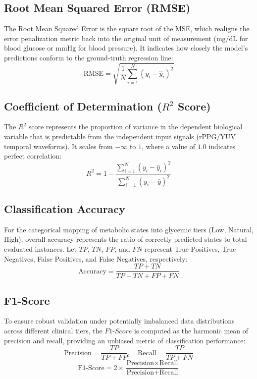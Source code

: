 \subsection{Root Mean Squared Error (RMSE)}
The Root Mean Squared Error is the square root of the MSE, which realigns the error penalization metric back into the original unit of measurement ($\text{mg/dL}$ for blood glucose or $\text{mmHg}$ for blood pressure). It indicates how closely the model's predictions conform to the ground-truth regression line:
\begin{equation}
\text{RMSE} = \sqrt{\frac{1}{N} \sum_{i=1}^{N} (y_i - \hat{y}_i)^2}
\end{equation}

\subsection{Coefficient of Determination (\texorpdfstring{$R^2$}{R2} Score)}
The $R^2$ score represents the proportion of variance in the dependent biological variable that is predictable from the independent input signals (rPPG/YUV temporal waveforms). It scales from $-\infty$ to $1$, where a value of $1.0$ indicates perfect correlation:
\begin{equation}
R^2 = 1 - \frac{\sum_{i=1}^{N} (y_i - \hat{y}_i)^2}{\sum_{i=1}^{N} (y_i - \bar{y})^2}
\end{equation}

\subsection{Classification Accuracy}
For the categorical mapping of metabolic states into glycemic tiers (Low, Natural, High), overall accuracy represents the ratio of correctly predicted states to total evaluated instances. Let $TP$, $TN$, $FP$, and $FN$ represent True Positives, True Negatives, False Positives, and False Negatives, respectively:
\begin{equation}
\text{Accuracy} = \frac{TP + TN}{TP + TN + FP + FN}
\end{equation}

\subsection{F1-Score}
To ensure robust validation under potentially imbalanced data distributions across different clinical tiers, the $F1\text{-}Score$ is computed as the harmonic mean of precision and recall, providing an unbiased metric of classification performance:
\begin{equation}
\text{Precision} = \frac{TP}{TP + FP}, \quad \text{Recall} = \frac{TP}{TP + FN}
\end{equation}
\begin{equation}
\text{F1-Score} = 2 \times \frac{\text{Precision} \times \text{Recall}}{\text{Precision} + \text{Recall}}
\end{equation}

